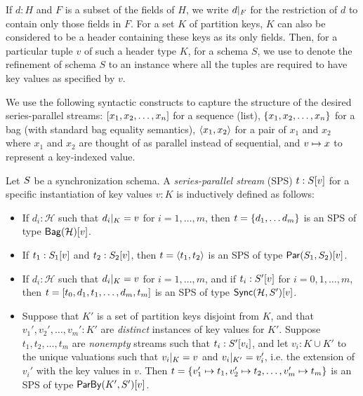 If $d : H$ and $F$ is a subset of the fields of $H$, we write $\tuprestrict{d}{F}$ for
the restriction of $d$ to contain only those fields in $F$.
For a set $K$ of partition keys, $K$ can also be considered to be a header containing these keys as its only fields.
Then, for a particular tuple $v$ of such a header type $K$, for a schema $S$, we use
 to denote the refinement of schema $S$ to an instance where all the tuples
are required to have key values as specified by $v$.

We use the following syntactic constructs to capture the structure of the desired series-parallel streams: $\spsseq{x_1, x_2, \ldots, x_n}$ for
a sequence (list), $\spsbag{x_1, x_2, \ldots, x_n}$ for a bag (with standard bag
equality semantics), $\spspargen{x_1, x_2}$ for a pair of $x_1$ and $x_2$ where
$x_1$ and $x_2$ are thought of as parallel instead of sequential,
and $\keyed{v}{x}$ to represent a key-indexed value.

\begin{definition}
\label{def:trace}
Let $\ss$ be a synchronization schema.
A \emph{series-parallel stream} (SPS) $t : \spstype{v}{\ss}$ for a specific instantiation of key values $v : K$ is inductively defined as follows:
\begin{itemize}
\item
If $d_i : \mathcal{H}$ such that $\tuprestrict{d_i}{K} = v$
for $i = 1, \ldots, m$,
then $t = \spsbag{d_1, \ldots d_m}$
is an SPS of type $\spstype{v}{\relleaf{\mathcal{H}}}$.
\item
If $t_1 : \spstype{v}{S_1}$
and $t_2 : \spstype{v}{S_2}$,
then $t = \spspar{t_1}{t_2}$
is an SPS of type $\spstype{v}{\parcomp{S_1}{S_2}}$.
\item
If $d_i : \mathcal{H}$ such that $\tuprestrict{d_i}{K} = v$
for $i = 1, \ldots, m$,
and if $t_i: \spstype{v}{S'}$ for $i = 0, 1, \ldots, m$,
then
$t = \spsseq{t_0, d_1, t_1, \ldots, d_m, t_m}$
is an SPS of type $\spstype{v}{\hier{\mathcal{H}}{S'}}$.
\item
Suppose that $K'$ is a set of partition keys disjoint from $K$,
and that $v_1', v_2', \ldots, v_m': K'$ are \emph{distinct} instances
of key values for $K'$.
Suppose $t_1, t_2, \ldots, t_m$ are \emph{nonempty} streams such that
$t_i: \spstype{v_i}{S'}$,
and let $v_i: K \cup K'$ to the unique valuations
such that $\tuprestrict{v_i}{K} = v$ and $\tuprestrict{v_i}{K'} = v_i'$,
i.e. the extension of $v_i'$ with the key values in $v$.
Then
$t = \spsbag{\keyed{v_1'}{t_1}, \keyed{v_2'}{t_2}, \ldots, \keyed{v_m'}{t_m}}$
is an SPS of type
$\spstype{v}{\keyby{K'}{S'}}$.
\end{itemize}
\end{definition}

